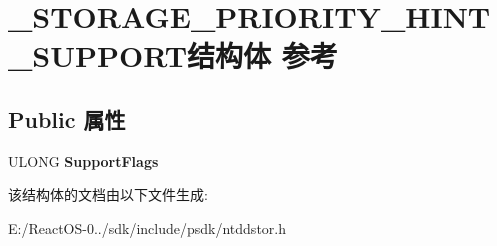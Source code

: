 \hypertarget{struct___s_t_o_r_a_g_e___p_r_i_o_r_i_t_y___h_i_n_t___s_u_p_p_o_r_t}{}\section{\+\_\+\+S\+T\+O\+R\+A\+G\+E\+\_\+\+P\+R\+I\+O\+R\+I\+T\+Y\+\_\+\+H\+I\+N\+T\+\_\+\+S\+U\+P\+P\+O\+R\+T结构体 参考}
\label{struct___s_t_o_r_a_g_e___p_r_i_o_r_i_t_y___h_i_n_t___s_u_p_p_o_r_t}
\subsection*{Public 属性}
\begin{DoxyCompactItemize}
\item 
\mbox{\label{struct___s_t_o_r_a_g_e___p_r_i_o_r_i_t_y___h_i_n_t___s_u_p_p_o_r_t_a2a28cd4461368873da0221484d323267}} 
U\+L\+O\+NG {\bfseries Support\+Flags}
\end{DoxyCompactItemize}


该结构体的文档由以下文件生成\+:\begin{DoxyCompactItemize}
\item 
E\+:/\+React\+O\+S-\/0../sdk/include/psdk/ntddstor.\+h\end{DoxyCompactItemize}

